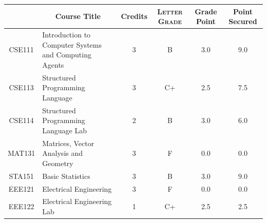 \documentclass[11pt]{article}
\newcommand*{\numtwo}[1]{\pgfmathprintnumber[
                    fixed, precision=2, fixed zerofill=true]{#1}}
\begin{document}
                \begin{center}
                    \renewcommand{\arraystretch}{1.08}
                    
                \begin{tabular}{|c|l|c|>{\scshape}c|c|c|}
                \hline  \rule[-1ex]{0pt}{3.5ex} {\centering{\bf Course Code}} &  \multicolumn{1}{c|}{\textbf{Course Title}}  & {\bf Credits} & {\bf Letter Grade} & {\bf Grade Point} & {\bf Point Secured}  \\ 
                \hline   CSE111 &  Introduction to Computer Systems and Computing Agents		 & 3 & B & 3.0 & 9.0 \\ %
                \hline   CSE113 &  Structured Programming Language		 & 3 & C+ & 2.5 & 7.5 \\ %
                \hline   CSE114 &  Structured Programming Language Lab		 & 2 & B & 3.0 & 6.0 \\ %
                \hline   MAT131 &  Matrices, Vector Analysis and Geometry		 & 3 & F & 0.0 & 0.0 \\ %
                \hline   STA151 &  Basic Statistics		 & 3 & B & 3.0 & 9.0 \\ %
                \hline   EEE121 &  Electrical Engineering		 & 3 & F & 0.0 & 0.0 \\ %
                \hline   EEE122 &  Electrical Engineering Lab		 & 1 & C+ & 2.5 & 2.5 \\ %

\hline                %
                \end{tabular}
                \end{center}
                \renewcommand{\arraystretch}{1.03}
\end{document}
